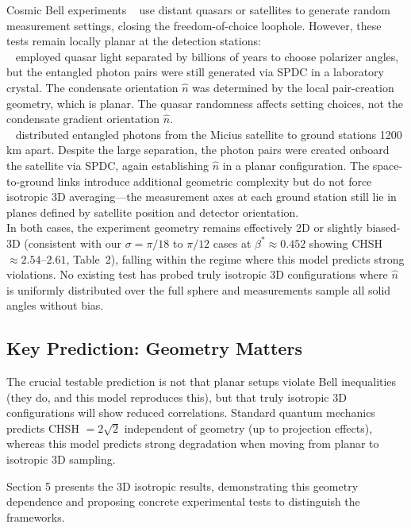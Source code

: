 \documentclass[11pt,a4paper]{article}
\theoremstyle{definition}
\theoremstyle{remark}
\begin{document}
Cosmic Bell experiments ~\cite{Handsteiner2017, Yin2017} use distant quasars or satellites to generate random measurement settings, closing the freedom-of-choice loophole. However, these tests remain locally planar at the detection stations:\\

~\cite{Handsteiner2017} employed quasar light separated by billions of years to choose polarizer angles, but the entangled photon pairs were still generated via SPDC in a laboratory crystal. The condensate orientation $\hat{n}$ was determined by the local pair-creation geometry, which is planar. The quasar randomness affects setting choices, not the condensate gradient orientation $\hat{n}$.\\

~\cite{Yin2017} distributed entangled photons from the Micius satellite to ground stations 1200 km apart. Despite the large separation, the photon pairs were created onboard the satellite via SPDC, again establishing $\hat{n}$ in a planar configuration. The space-to-ground links introduce additional geometric complexity but do not force isotropic 3D averaging---the measurement axes at each ground station still lie in planes defined by satellite position and detector orientation.\\

In both cases, the experiment geometry remains effectively 2D or slightly biased-3D (consistent with our $\sigma = \pi/18$ to $\pi/12$ cases at $\beta^*\approx0.452$ showing CHSH $\approx 2.54$--$2.61$, Table~2), falling within the regime where this model predicts strong violations. No existing test has probed truly isotropic 3D configurations where $\hat{n}$ is uniformly distributed over the full sphere and measurements sample all solid angles without bias.

\subsection{Key Prediction: Geometry Matters}

The crucial testable prediction is not that planar setups violate Bell inequalities (they do, and this model reproduces this), but that truly isotropic 3D configurations will show reduced correlations. Standard quantum mechanics predicts CHSH $= 2\sqrt{2}$ independent of geometry (up to projection effects), whereas this model predicts strong degradation when moving from planar to isotropic 3D sampling.

Section 5 presents the 3D isotropic results, demonstrating this geometry dependence and proposing concrete experimental tests to distinguish the frameworks.
\end{document}
